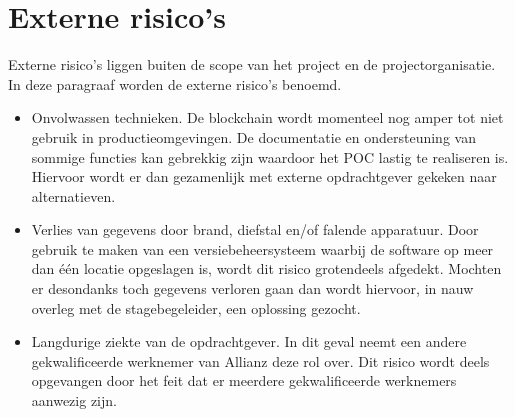 \section{Externe risico's}
Externe risico's liggen buiten de scope van het project en de projectorganisatie. In deze paragraaf worden de externe risico's benoemd.\par
\begin{itemize}
\item Onvolwassen technieken. De blockchain wordt momenteel nog amper tot niet gebruik in productieomgevingen. De documentatie en ondersteuning van sommige functies kan gebrekkig zijn waardoor het POC lastig te realiseren is. Hiervoor wordt er dan gezamenlijk met externe opdrachtgever gekeken naar alternatieven.
\item Verlies van gegevens door brand, diefstal en/of falende apparatuur. Door gebruik te maken van een versiebeheersysteem waarbij de software op meer dan één locatie opgeslagen is, wordt dit risico grotendeels afgedekt. Mochten er desondanks toch gegevens verloren gaan dan wordt hiervoor, in nauw overleg met de stagebegeleider, een oplossing gezocht.
\item Langdurige ziekte van de opdrachtgever. In dit geval neemt een andere gekwalificeerde werknemer van Allianz deze rol over. Dit risico wordt deels opgevangen door het feit dat er meerdere gekwalificeerde werknemers aanwezig zijn.
\end{itemize}
